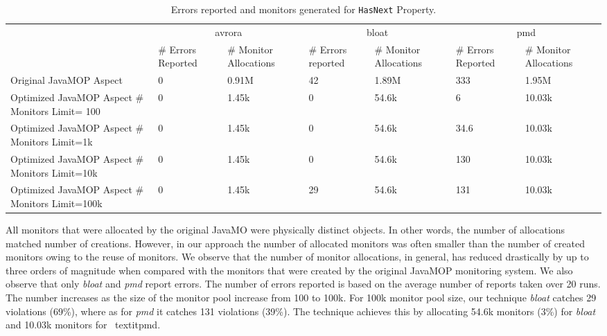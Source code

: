 \begin{table*}[!ht]
\centering
\begin{tabular}{|p{3.7cm}|p{1.2cm}|p{1.5cm}|p{1.2cm}|p{1.5cm}|p{1.2cm}|p{1.5cm}|
}
\hline
\multirow{2}{*}{}               & \multicolumn{2}{c|}{avrora}             & 
\multicolumn{2}{c|}{bloat}            & \multicolumn{2}{c|}{pmd}              \\ 
\cline{2-7} 
                                       & \# Errors Reported  & \# Monitor 
Allocations & \# Errors reported & \# Monitor Allocations& \# Errors Reported & 
\# Monitor Allocations\\ \hline
Original JavaMOP Aspect                                                    & 0   
           & 0.91M         & 42          & 1.89M            & 333               
& 1.95M     \\ \hline
Optimized JavaMOP Aspect  \# Monitors Limit= 100            & 0             & 
1.45k           & 0            & 54.6k              & 6                  & 
10.03k       \\ \hline
Optimized JavaMOP Aspect  \# Monitors Limit=1k           & 0             & 1.45k 
          & 0            & 54.6k             & 34.6              & 10.03k       
\\ \hline
Optimized JavaMOP Aspect  \# Monitors Limit=10k        & 0             & 1.45k   
        & 0            & 54.6k             & 130               & 10.03k       \\ 
\hline
Optimized JavaMOP Aspect  \# Monitors Limit=100k      & 0             & 1.45k    
       & 29          & 54.6k             & 131               & 10.03k       \\ 
\hline
\end{tabular}
\caption{Errors reported and monitors generated for \texttt{HasNext} Property.}
\end{table*}
\label{table:errorreporting1}

All monitors that were allocated by the original JavaMO were physically distinct 
objects. In other words, the number of allocations matched number of creations. 
However, in our approach the number of allocated monitors was often smaller than 
the number of created monitors owing to the reuse of monitors. We observe that 
the number of monitor allocations, in general, has reduced drastically by up to 
three orders of magnitude when compared with the monitors that were created by 
the original JavaMOP monitoring system. We also observe that only \textit{bloat} 
and \textit{pmd} report errors. The number of errors reported is based on the 
average number of reports taken over 20 runs. The number increases as the size 
of the monitor pool increase from 100 to 100k. For 100k monitor pool size, our 
technique \textit{bloat} catches 29 violations (69\%), where as for \textit{pmd} 
it catches 131 violations (39\%). The technique achieves this by allocating 
54.6k monitors (3\%) for \textit{bloat} and 10.03k monitors for \
textit{pmd}.

